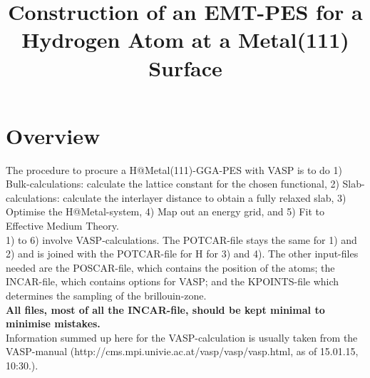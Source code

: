 \documentclass[11pt,oneside,a4paper, captions=nooneline, headsepline]{article}%
\title{\huge{Construction of an EMT-PES for a Hydrogen Atom at a Metal(111) Surface}}
\begin{document}
\maketitle
\section*{Overview}
The procedure to procure a H@Metal(111)-GGA-PES with VASP is to do 1) Bulk-calculations: calculate the lattice constant for the chosen functional, 2) Slab-calculations: calculate the interlayer distance to obtain a fully relaxed slab, 3) Optimise the H@Metal-system, 4) Map out an energy grid, and 5) Fit to Effective Medium Theory.\\
1) to 6) involve VASP-calculations. The POTCAR-file stays the same for 1) and 2) and is joined with the POTCAR-file for H for 3) and 4). The other input-files needed are the POSCAR-file, which contains the position of the atoms; the INCAR-file, which contains options for VASP; and the KPOINTS-file which determines the sampling of the brillouin-zone.\\
\textbf{All files, most of all the INCAR-file, should be kept minimal to minimise mistakes.}\\
Information summed up here for the VASP-calculation is usually taken from the VASP-manual (http://cms.mpi.univie.ac.at/vasp/vasp/vasp.html, as of 15.01.15, 10:30.).
\end{document}
